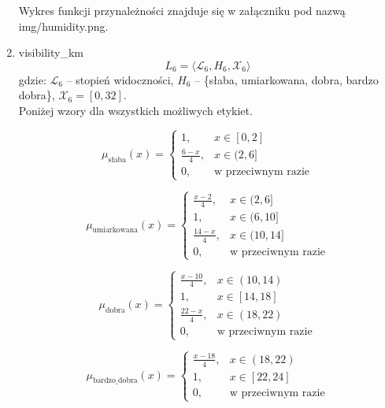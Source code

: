 \documentclass{article}
\begin{document}
\begin{enumerate}
Wykres funkcji przynależności znajduje się w załączniku pod nazwą img/humidity.png.

    \item visibility\_km
    \begin{equation}
            L_6 = \langle \mathcal{L}_6, H_6, \mathcal{X}_6 \rangle
        \end{equation}
        gdzie: $\mathcal{L}_6$ – stopień widoczności, $H_6$ – \{słaba, umiarkowana, dobra, bardzo dobra\}, $\mathcal{X}_6 = [0, 32]$. \\
        Poniżej wzory dla wszystkich możliwych etykiet.
        
    \begin{equation}
    \mu_{\text{słaba}}(x) =
    \begin{cases}
    1, & x \in [0, 2] \\
    \frac{6 - x}{4}, & x \in (2, 6] \\
    0, & \text{w przeciwnym razie}
    \end{cases}
    \end{equation}
    
    \begin{equation}
    \mu_{\text{umiarkowana}}(x) =
    \begin{cases}
    \frac{x - 2}{4}, & x \in (2, 6] \\
    1, & x \in (6, 10] \\
    \frac{14 - x}{4}, & x \in (10, 14] \\
    0, & \text{w przeciwnym razie}
    \end{cases}
    \end{equation}
    
    \begin{equation}
    \mu_{\text{dobra}}(x) =
    \begin{cases}
    \frac{x - 10}{4}, & x \in (10, 14) \\
    1, & x \in [14, 18] \\
    \frac{22 - x}{4}, & x \in (18, 22) \\
    0, & \text{w przeciwnym razie}
    \end{cases}
    \end{equation}

    \begin{equation}
    \mu_{\text{bardzo\_dobra}}(x) =
    \begin{cases}
    \frac{x - 18}{4}, & x \in (18, 22) \\
    1, & x \in [22, 24] \\
    0, & \text{w przeciwnym razie}
    \end{cases}
    \end{equation}


\end{enumerate}
\end{document}
